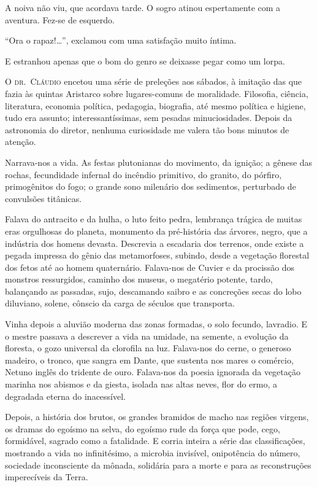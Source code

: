 A noiva não viu, que acordava tarde. O sogro atinou espertamente com a
aventura. Fez{}-se de esquerdo. 

``Ora o rapaz!\ldots'', exclamou com uma satisfação muito íntima. 

E estranhou apenas que o bom do genro se
deixasse pegar como um lorpa.

\sectionitem

\noindent\textsc{O dr.~Cláudio} encetou uma série de preleções aos sábados, à imitação das
que fazia às quintas Aristarco sobre lugares{}-comuns de moralidade.
Filosofia, ciência, literatura, economia política, pedagogia,
biografia, até mesmo política e higiene, tudo era assunto;
interessantíssimas, sem pesadas minuciosidades. Depois da astronomia do
diretor, nenhuma curiosidade me valera tão bons minutos de atenção.

Narrava{}-nos a vida. As festas plutonianas do movimento, da ignição; a
gênese das rochas, fecundidade infernal do incêndio primitivo, do
granito, do pórfiro, primogênitos do fogo; o grande sono milenário dos
sedimentos, perturbado de convulsões titânicas. 

Falava do antracito e
da hulha, o luto feito pedra, lembrança trágica de muitas eras
orgulhosas do planeta, monumento da pré{}-história das árvores, negro,
que a indústria dos homens devasta. Descrevia a escadaria dos terrenos,
onde existe a pegada impressa do gênio das metamorfoses, subindo, desde
a vegetação florestal dos fetos até ao homem quaternário. Falava{}-nos
de Cuvier e da procissão dos monstros ressurgidos, caminho dos museus,
o megatério potente, tardo, balançando as passadas, sujo, descamando
saibro e as concreções secas do lobo diluviano, solene, cônscio da
carga de séculos que transporta.

Vinha depois a aluvião moderna das zonas formadas, o solo fecundo,
lavradio. E o mestre passava a descrever a vida na umidade, na semente,
a evolução da floresta, o gozo universal da clorofila na luz.
Falava{}-nos do cerne, o generoso madeiro, o tronco, que sangra em
Dante, que sustenta nos mares o comércio, Netuno inglês do tridente de
ouro. Falava{}-nos da poesia ignorada da vegetação marinha nos abismos
e da giesta, isolada nas altas neves, flor do ermo, a degradada eterna
do inacessível. 

Depois, a história dos brutos, os grandes bramidos de
macho nas regiões virgens, os dramas do egoísmo na selva, do egoísmo
rude da força que pode, cego, formidável, sagrado como a fatalidade. E
corria inteira a série das classificações, mostrando a vida no
infinitésimo, a microbia invisível, onipotência do número, sociedade
inconsciente da mônada, solidária para a morte e para as reconstruções
imperecíveis da Terra. 

